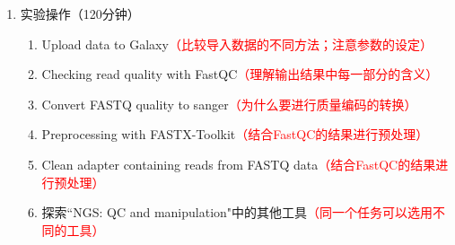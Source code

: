 \documentclass{TIJMUjiaoanSY}
\begin{document}
\begin{enumerate}
\begin{multicols}{2}
\begin{enumerate}
\begin{itemize}
           \item Filter sequences based on quality
           \item ...
         \end{itemize}
      \end{enumerate}
    \end{multicols}
  \item 实验操作（120分钟）
    \begin{enumerate}
      \item Upload data to Galaxy\textcolor{red}{（比较导入数据的不同方法；注意参数的设定）}
      \item Checking read quality with FastQC\textcolor{red}{（理解输出结果中每一部分的含义）}
      \item Convert FASTQ quality to sanger\textcolor{red}{（为什么要进行质量编码的转换）}
      \item Preprocessing with FASTX-Toolkit\textcolor{red}{（结合FastQC的结果进行预处理）}
      \item Clean adapter containing reads from FASTQ data\textcolor{red}{（结合FastQC的结果进行预处理）}
      \item 探索``NGS: QC and manipulation"中的其他工具\textcolor{red}{（同一个任务可以选用不同的工具）}
    \end{enumerate}
\end{enumerate}


\otherTail
\end{document}
